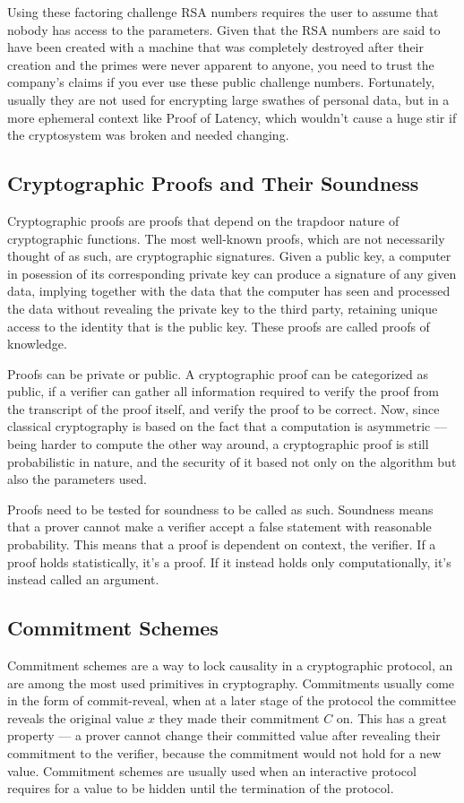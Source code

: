 Using these factoring challenge RSA numbers requires the user to assume that nobody has access to the parameters. Given that the RSA numbers are said to have been created with a machine that was completely destroyed after their creation and the primes were never apparent to anyone, you need to trust the company's claims if you ever use these public challenge numbers. Fortunately, usually they are not used for encrypting large swathes of personal data, but in a more ephemeral context like Proof of Latency, which wouldn't cause a huge stir if the cryptosystem was broken and needed changing.

\subsection{Cryptographic Proofs and Their Soundness}
Cryptographic proofs are proofs that depend on the trapdoor nature of cryptographic functions. The most well-known proofs, which are not necessarily thought of as such, are cryptographic signatures. Given a public key, a computer in posession of its corresponding private key can produce a signature of any given data, implying together with the data that the computer has seen and processed the data without revealing the private key to the third party, retaining unique access to the identity that is the public key. These proofs are called proofs of knowledge.

Proofs can be private or public. A cryptographic proof can be categorized as public, if a verifier can gather all information required to verify the proof from the transcript of the proof itself, and verify the proof to be correct. Now, since classical cryptography is based on the fact that a computation is asymmetric --- being harder to compute the other way around, a cryptographic proof is still probabilistic in nature, and the security of it based not only on the algorithm but also the parameters used.

Proofs need to be tested for soundness to be called as such. Soundness means that a prover cannot make a verifier accept a false statement with reasonable probability. This means that a proof is dependent on context, the verifier. If a proof holds statistically, it's a proof. If it instead holds only computationally, it's instead called an argument.


\subsection{Commitment Schemes}
Commitment schemes are a way to lock causality in a cryptographic protocol, an are among the most used primitives in cryptography. Commitments usually come in the form of commit-reveal, when at a later stage of the protocol the committee reveals the original value \(x\) they made their commitment \(C\) on. This has a great property --- a prover cannot change their committed value after revealing their commitment to the verifier, because the commitment would not hold for a new value. Commitment schemes are usually used when an interactive protocol requires for a value to be hidden until the termination of the protocol.

